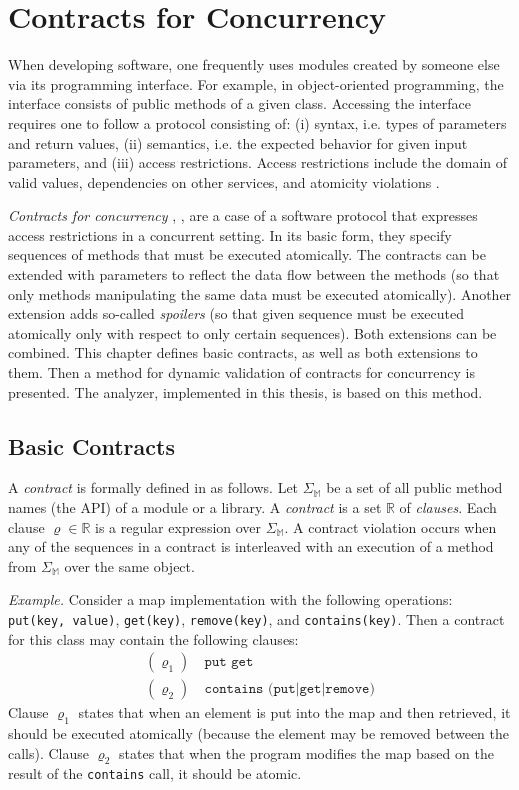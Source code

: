 \chapter{Contracts for Concurrency}
\label{chThree}

When developing software, one frequently uses modules created by someone else
via its programming interface. For example, in object-oriented programming, the
interface consists of public methods of a given class. Accessing the interface
requires one to follow a protocol consisting of: (i) syntax, i.e. types of
parameters and return values, (ii) semantics, i.e. the expected behavior for
given input parameters, and (iii) access restrictions. Access restrictions
include the domain of valid values, dependencies on other services, and
atomicity violations \cite{contracts}.

\emph{Contracts for concurrency} \cite{FITPUB10817},
\cite{DBLP:journals/corr/SousaDFL15}, are a case of a software protocol that
expresses access restrictions in a concurrent setting. In its basic form, they
specify sequences of methods that must be executed atomically. The contracts can
be extended with parameters to reflect the data flow between the methods (so
that only methods manipulating the same data must be executed atomically).
Another extension adds so-called \emph{spoilers} (so that given sequence must be
executed atomically only with respect to only certain sequences). Both
extensions can be combined. This chapter defines basic contracts, as well as
both extensions to them. Then a method for dynamic validation of contracts for
concurrency is presented. The analyzer, implemented in this thesis, is based on
this method.

\section{Basic Contracts}
\label{basicContracts}

A \emph{contract} is formally defined in \cite{FITPUB10817} as follows. Let
$\Sigma_\mathbb{M}$ be a set of all public method names (the API) of a module or
a library. A \emph{contract} is a set $\mathbb{R}$ of \emph{clauses}. Each
clause $\varrho \in \mathbb{R}$ is a regular expression over
$\Sigma_\mathbb{M}$. A contract violation occurs when any of the sequences in a
contract is interleaved with an execution of a method from $\Sigma_\mathbb{M}$
over the same object.

\emph{Example.} Consider a map implementation with the following operations:
\texttt{put(key, value)}, \texttt{get(key)}, \texttt{remove(key)}, and
\texttt{contains(key)}. Then a contract for this class may contain the following
clauses:
\begin{align*}
    (\varrho_1) &\ \texttt{put get}\\
    (\varrho_2) &\ \texttt{contains (put|get|remove)}
\end{align*}
Clause $\varrho_1$ states that when an element is put into the map and then
retrieved, it should be executed atomically (because the element may be removed
between the calls). Clause $\varrho_2$ states that when the program modifies the
map based on the result of the \texttt{contains} call, it should be atomic.

